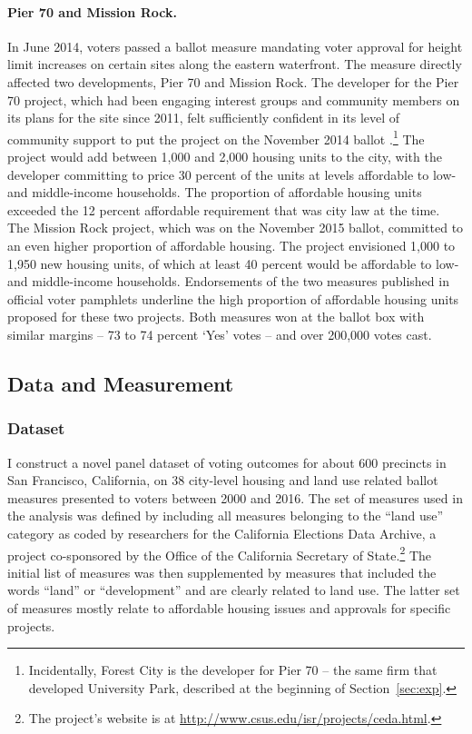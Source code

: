\documentclass[article,11pt]{memoir}
\begin{document}
\paragraph{Pier 70 and Mission Rock.} In June 2014, voters passed a ballot measure mandating voter approval for height limit increases on certain sites along the eastern waterfront. The measure directly affected two developments, Pier 70 and Mission Rock.  The developer for the Pier 70 project, which had been engaging interest groups and community members on its plans for the site since 2011, felt sufficiently confident in its level of community support to put the project on the November 2014 ballot \citep{kuwada_shaping_2015}.\footnote{Incidentally, Forest City is the developer for Pier 70 -- the same firm that developed University Park, described at the beginning of Section~\ref{sec:exp}.} The project would add between 1,000 and 2,000 housing units to the city, with the developer committing to price 30 percent of the units at levels affordable to low- and middle-income households. The proportion of affordable housing units exceeded the 12 percent affordable requirement that was city law at the time. The Mission Rock project, which was on the November 2015 ballot, committed to an even higher proportion of affordable housing. The project envisioned 1,000 to 1,950 new housing units, of which at least 40 percent would be affordable to low- and middle-income households. Endorsements of the two measures published in official voter pamphlets underline the high proportion of affordable housing units proposed for these two projects.  Both measures won at the ballot box with similar margins -- 73 to 74 percent `Yes' votes -- and over 200,000 votes cast.

\subsection{Data and Measurement}

\subsubsection{Dataset}

I construct a novel panel dataset of voting outcomes for about 600 precincts in San Francisco, California, on 38 city-level housing and land use related ballot measures presented to voters between 2000 and 2016. The set of measures used in the analysis was defined by including all measures belonging to the ``land use'' category as coded by researchers for the California Elections Data Archive, a project co-sponsored by the Office of the California Secretary of State.\footnote{The project's website is at \url{http://www.csus.edu/isr/projects/ceda.html}.} The initial list of measures was then supplemented by measures that included the words ``land'' or ``development'' and are clearly related to land use. The latter set of measures mostly relate to affordable housing issues and approvals for specific projects.
\end{document}
